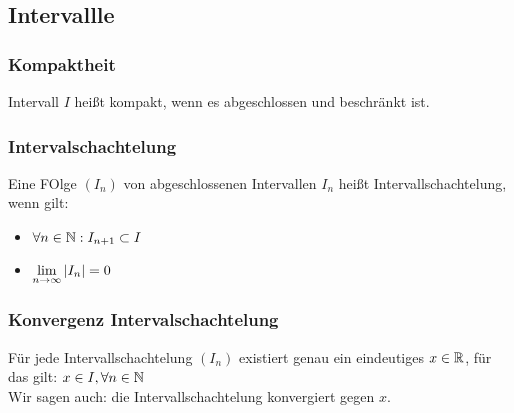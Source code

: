 \subsection*{Intervallle}
\subsubsection*{Kompaktheit}
Intervall $I$ heißt kompakt, wenn es abgeschlossen und beschränkt ist.
\subsubsection*{Intervalschachtelung}
Eine FOlge $(I_n)$ von abgeschlossenen Intervallen $I_n$ heißt Intervallschachtelung, wenn gilt:
\begin{itemize}[noitemsep]
    \item $\forall n \in \mathbb N: I_{n+1} \subset I$
    \item $\lim\limits_{n \rightarrow \infty} |I_n| = 0$
\end{itemize}
\subsubsection*{Konvergenz Intervalschachtelung}
Für jede Intervallschachtelung $(I_n)$ existiert genau ein eindeutiges $x \in \mathbb R$, für das gilt: $x \in I, \forall n \in \mathbb N$\\
Wir sagen auch: die Intervallschachtelung konvergiert gegen $x$.